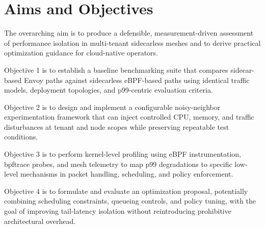 \section{Aims and Objectives}
The overarching aim is to produce a defensible, measurement-driven assessment of performance isolation in multi-tenant sidecarless meshes and to derive practical optimization guidance for cloud-native operators.

Objective 1 is to establish a baseline benchmarking suite that compares sidecar-based Envoy paths against sidecarless eBPF-based paths using identical traffic models, deployment topologies, and p99-centric evaluation criteria.

Objective 2 is to design and implement a configurable noisy-neighbor experimentation framework that can inject controlled CPU, memory, and traffic disturbances at tenant and node scopes while preserving repeatable test conditions.

Objective 3 is to perform kernel-level profiling using eBPF instrumentation, bpftrace probes, and mesh telemetry to map p99 degradations to specific low-level mechanisms in packet handling, scheduling, and policy enforcement.

Objective 4 is to formulate and evaluate an optimization proposal, potentially combining scheduling constraints, queueing controls, and policy tuning, with the goal of improving tail-latency isolation without reintroducing prohibitive architectural overhead.
